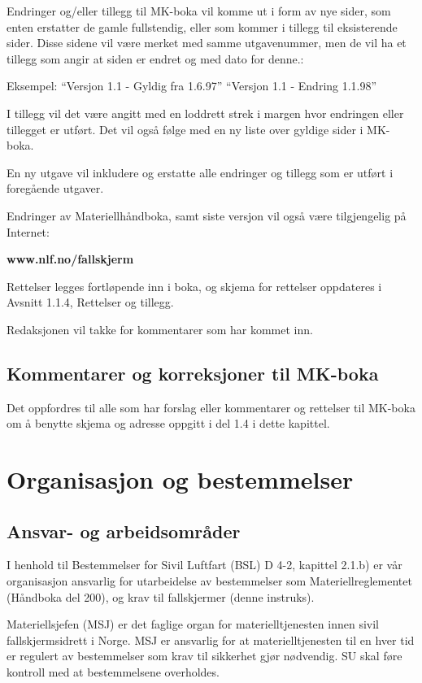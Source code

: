 Endringer og/eller tillegg til MK-boka vil komme ut i form av nye sider, som enten erstatter de gamle fullstendig, eller som kommer i tillegg til eksisterende sider. Disse sidene vil være merket med samme utgavenummer, men de vil ha et tillegg som angir at siden er endret og med dato for denne.:

Eksempel: ``Versjon 1.1 - Gyldig fra 1.6.97''
``Versjon 1.1 - Endring 1.1.98''

I tillegg vil det være angitt med en loddrett strek i margen hvor endringen eller tillegget er utført. Det vil også følge med en ny liste over gyldige sider i MK-boka.

En ny utgave vil inkludere og erstatte alle endringer og tillegg som er utført i foregående utgaver.

Endringer av Materiellhåndboka, samt siste versjon vil også være tilgjengelig på Internet:

\textbf{www.nlf.no/fallskjerm}

Rettelser legges fortløpende inn i boka, og skjema for rettelser oppdateres i Avsnitt 1.1.4, Rettelser og tillegg.

Redaksjonen vil takke for kommentarer som har kommet inn.

\subsection{Kommentarer og korreksjoner til MK-boka}
Det oppfordres til alle som har forslag eller kommentarer og rettelser til MK-boka om å benytte skjema og adresse oppgitt i del 1.4 i dette kapittel.

\section{Organisasjon og bestemmelser}
\subsection{Ansvar- og arbeidsområder}
I henhold til Bestemmelser for Sivil Luftfart (BSL) D 4-2, kapittel 2.1.b) er vår organisasjon ansvarlig for utarbeidelse av bestemmelser som Materiellreglementet (Håndboka del 200), og krav til fallskjermer (denne instruks).

Materiellsjefen (MSJ) er det faglige organ for materielltjenesten innen sivil fallskjermsidrett i Norge. MSJ er ansvarlig for at materielltjenesten til en hver tid er regulert av bestemmelser som krav til sikkerhet gjør nødvendig. SU skal føre kontroll med at bestemmelsene overholdes.

